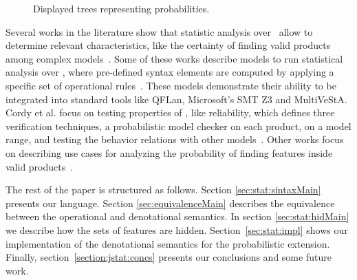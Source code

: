 \begin{figure}[h]
\begin{minipage}{0.4\hsize}
\begin{minipage}{0.2\hsize}
{}
		\end{minipage}
		
	\end{minipage}
	
	\caption{Displayed trees representing probabilities.}
	\label{fig:displayedTrees}
	
\end{figure}



Several works in the literature show that statistic analysis over \SPLs\ allow to determine relevant characteristics, like the certainty of finding valid products among complex models~\cite{tllv15,tlll15,chssgl13,dpcslsh17}.
%
Some of these works describe models to run statistical analysis over \SPLs, where pre-defined syntax elements are computed by applying a specific set of operational rules~\cite{tllv15,tlll15}. These models demonstrate their ability to be integrated into standard tools like QFLan, Microsoft's SMT Z3 and MultiVeStA.
%
%
Cordy et al. focus on testing properties of \SPLs, like reliability, which defines three verification techniques, a probabilistic model checker on each product, on a model range, and testing the behavior relations with other models~\cite{chssgl13}. Other works focus on describing use cases for analyzing the probability of finding features inside valid products~\cite{dpcslsh17}. %

The rest of the paper is structured as follows. Section \ref{sec:stat:sintaxMain} presents our language. Section \ref{sec:equivalenceMain} describes the equivalence between the operational and denotational semantics. In section \ref{sec:stat:hidMain} we describe how the sets of features are hidden. Section~\ref{sec:stat:impl} shows our implementation of the denotational semantics for the probabilistic extension. Finally, section~\ref{section:jstat:concs} presents our conclusions and some future work.

